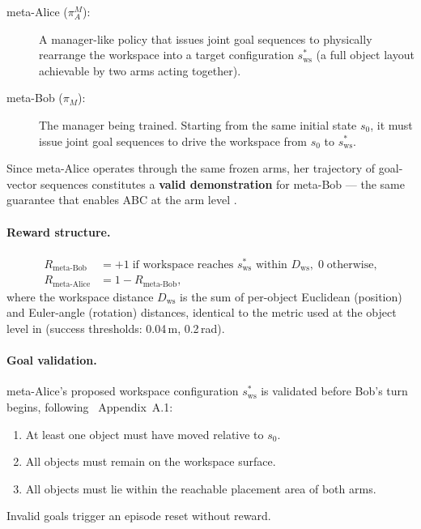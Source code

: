\documentclass[12pt, a4paper]{article}
\newcommand{\piA}{\pi_A}
\newcommand{\piM}{\pi_M}
\newcommand{\sstar}{s^{*}}
\begin{document}
\begin{description}
    \item[meta-Alice ($\piA^M$):] A manager-like policy that issues joint goal sequences
          to physically rearrange the workspace into a target configuration $\sstar_{\mathrm{ws}}$
          (a full object layout achievable by two arms acting together).

    \item[meta-Bob ($\piM$):] The manager being trained. Starting from the same initial
          state $s_0$, it must issue joint goal sequences to drive the workspace from
          $s_0$ to $\sstar_{\mathrm{ws}}$.
\end{description}

Since meta-Alice operates through the same frozen arms, her trajectory of goal-vector
sequences constitutes a \textbf{valid demonstration} for meta-Bob — the same guarantee
that enables ABC at the arm level \cite{plappert2021asymmetric}.

\paragraph{Reward structure.}
\begin{align}
    R_{\text{meta-Bob}} &= +1 \;\text{if workspace reaches } \sstar_{\mathrm{ws}} \text{ within } D_{\mathrm{ws}},\;
                            0 \;\text{otherwise,} \label{eq:meta_bob_rew}\\
    R_{\text{meta-Alice}} &= 1 - R_{\text{meta-Bob}}, \label{eq:meta_alice_rew}
\end{align}
where the workspace distance $D_{\mathrm{ws}}$ is the sum of per-object Euclidean
(position) and Euler-angle (rotation) distances, identical to the metric used at
the object level in \citet{plappert2021asymmetric} (success thresholds: 0.04\,m,
0.2\,rad).

\paragraph{Goal validation.}
meta-Alice's proposed workspace configuration $\sstar_{\mathrm{ws}}$ is validated before
Bob's turn begins, following \citet{plappert2021asymmetric}~Appendix~A.1:
\begin{enumerate}[label=\arabic*., nosep]
    \item At least one object must have moved relative to $s_0$.
    \item All objects must remain on the workspace surface.
    \item All objects must lie within the reachable placement area of both arms.
\end{enumerate}
Invalid goals trigger an episode reset without reward.
\end{document}
